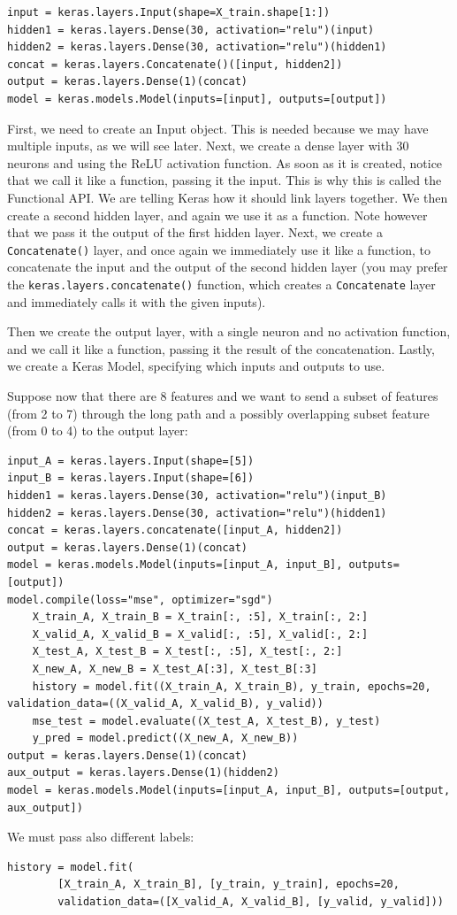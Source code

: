 \documentclass[12pt, letterpaper]{article}
\theoremstyle{definition}
\begin{document}
\begin{lstlisting}
input = keras.layers.Input(shape=X_train.shape[1:])
hidden1 = keras.layers.Dense(30, activation="relu")(input)
hidden2 = keras.layers.Dense(30, activation="relu")(hidden1)
concat = keras.layers.Concatenate()([input, hidden2])
output = keras.layers.Dense(1)(concat)
model = keras.models.Model(inputs=[input], outputs=[output])
\end{lstlisting}

First, we need to create an Input object. This is needed because we may have multiple inputs, as we will see later. Next, we create a dense layer with 30 neurons and using the ReLU activation function. As soon as it is created, notice that we call it like a function, passing it the input. This is why this is called the Functional API. We are telling Keras how it should link layers together. We then create a second hidden layer, and again we use it as a function. Note however that we pass it the output of the first hidden layer. Next, we create a \lstinline+Concatenate()+ layer, and once again we immediately use it like a function, to concatenate the input and the output of the second hidden layer (you may prefer the \lstinline+keras.layers.concatenate()+ function, which creates a \lstinline+Concatenate+ layer and immediately calls it with the given inputs). 

Then we create the output layer, with a single neuron and no activation function, and we call it like a function, passing it the result of the concatenation. Lastly, we create a Keras Model, specifying which inputs and outputs to use.

Suppose now that there are 8 features and we want to send a subset of features (from 2 to 7) through the long path and a possibly overlapping subset feature (from 0 to 4) to the output layer:
\begin{lstlisting}
input_A = keras.layers.Input(shape=[5])
input_B = keras.layers.Input(shape=[6])
hidden1 = keras.layers.Dense(30, activation="relu")(input_B)
hidden2 = keras.layers.Dense(30, activation="relu")(hidden1)
concat = keras.layers.concatenate([input_A, hidden2])
output = keras.layers.Dense(1)(concat)
model = keras.models.Model(inputs=[input_A, input_B], outputs=[output])
model.compile(loss="mse", optimizer="sgd")
    X_train_A, X_train_B = X_train[:, :5], X_train[:, 2:]
    X_valid_A, X_valid_B = X_valid[:, :5], X_valid[:, 2:]
    X_test_A, X_test_B = X_test[:, :5], X_test[:, 2:]
    X_new_A, X_new_B = X_test_A[:3], X_test_B[:3]
    history = model.fit((X_train_A, X_train_B), y_train, epochs=20, validation_data=((X_valid_A, X_valid_B), y_valid))
    mse_test = model.evaluate((X_test_A, X_test_B), y_test)
    y_pred = model.predict((X_new_A, X_new_B))
output = keras.layers.Dense(1)(concat)
aux_output = keras.layers.Dense(1)(hidden2)
model = keras.models.Model(inputs=[input_A, input_B], outputs=[output, aux_output])
\end{lstlisting}
We must pass also different labels:
\begin{lstlisting}
history = model.fit(
        [X_train_A, X_train_B], [y_train, y_train], epochs=20,
        validation_data=([X_valid_A, X_valid_B], [y_valid, y_valid]))
\end{lstlisting}
\end{document}
